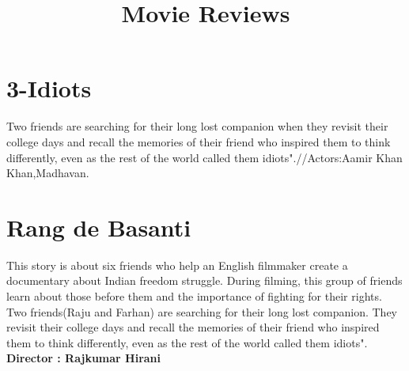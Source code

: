 \documentclass{article}
\title{Movie Reviews}
\begin{document}
	\maketitle
	\section{3-Idiots}
	\large{Two friends are searching for their long lost companion when they revisit their college days and recall the memories of their friend who inspired them to think differently, even as the rest of the world called them idiots".//Actors:Aamir Khan Khan,Madhavan.}
	\section{Rang de Basanti}
	\large{This story is about six friends who help an English filmmaker create a documentary about Indian freedom struggle. During filming, this group of friends learn about those before them and the importance of fighting for their rights.}
	\large{Two friends(Raju and Farhan) are searching for their long lost companion. They revisit their college days and recall the memories of their friend who inspired them to think differently, even as the rest of the world called them idiots".}
\\
\textbf{Director : Rajkumar Hirani}
\\
\end{document}
